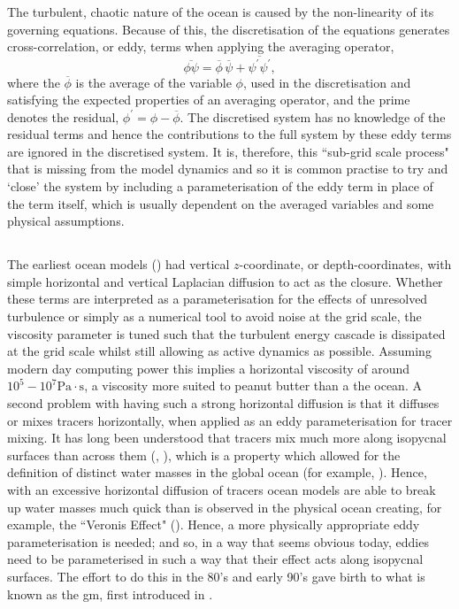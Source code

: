 \documentclass[12pt,a4paper]{report}
\newcommand*\mean[1]{\overline{#1}}
\newcommand*\res[1]{{#1}^{\prime}}
\begin{document}
 The turbulent, chaotic nature of the ocean is caused by the non-linearity of its 
 governing equations. Because of this,  the discretisation of the equations generates cross-correlation, or eddy, terms when applying the 
 averaging operator,
 \begin{equation}
 \mean{\phi\psi} = \mean{\phi}\,\mean{\psi} + 
 \mean{\res{\psi}\res{\psi}},
 \label{non-lin average}
 \end{equation}
 where the ${\mean{\phi}}$ is the average of the variable ${\phi}$, used in
 the discretisation and satisfying
 the expected properties of an averaging operator, and the prime denotes the residual, ${\phi^{\prime} = \phi - \mean{\phi}}$.
 The discretised system has no knowledge of the residual terms and hence
 the contributions to the full system by these eddy terms are
 ignored in the discretised system. It is, therefore, this ``sub-grid scale process"
 that is missing from the model dynamics and so it is common practise to try and
 `close' the system by including a parameterisation of the eddy
 term in place of the term itself, which is usually dependent on the averaged 
 variables and some physical assumptions.
 
 \subsection{\cite{gent1990}}
 
 The earliest ocean models (\cite{bryan1969numerical}) had vertical $z$-coordinate, or depth-coordinates, with simple horizontal and vertical Laplacian diffusion to act as 
 the closure. Whether these terms are interpreted as a parameterisation for the effects
 of unresolved turbulence or simply as a numerical tool to avoid noise at 
 the grid scale, the viscosity parameter is tuned such that the turbulent energy cascade is 
 dissipated at the grid scale whilst still allowing as active dynamics as possible. 
 Assuming modern day computing power this implies a horizontal viscosity of around 
 $10^{5} - 10^{7} \mathrm{Pa} \cdot \mathrm{s}$, a viscosity more suited to peanut butter than 
 a the ocean. A second problem with having such a strong horizontal diffusion is
 that it diffuses or mixes tracers horizontally, when applied as
 an eddy parameterisation for tracer mixing. It has long been understood that tracers 
 mix much more along isopycnal surfaces than across them (\cite{iselin1939influence}, \cite{montgomery1940present}), which is a property which allowed for the definition of
 distinct water masses in the global ocean (for example, \cite{emery1986global}).
  Hence, with an excessive horizontal diffusion
 of tracers ocean models are able to break up water masses much quick than
 is observed in the physical ocean creating, for example, the ``Veronis Effect" (\cite{veronis1975role}).
 Hence, a more physically appropriate eddy parameterisation 
 is needed;
  and so, in a way that seems obvious today, eddies need to be
   parameterised in 
 such a way that their effect acts along isopycnal surfaces. 
 The effort to do this in the 80's and early 90's gave birth
 to what is known as the \gls{gm}, first introduced in \cite{gent1990}.
 
\end{document}
